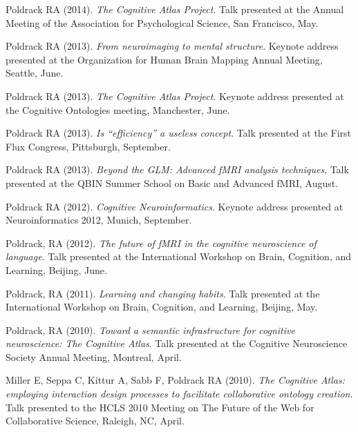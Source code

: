 \documentclass[10pt, letterpaper]{article}
\begin{document}
Poldrack RA (2014). \emph{The Cognitive Atlas Project}. Talk presented at the Annual Meeting of the Association for Psychological Science, San Francisco, May. \vspace{2mm}

Poldrack RA (2013). \emph{From neuroimaging to mental structure}. Keynote address presented at the Organization for Human Brain Mapping Annual Meeting, Seattle, June. \vspace{2mm}

Poldrack RA (2013). \emph{The Cognitive Atlas Project}. Keynote address presented at the Cognitive Ontologies meeting, Manchester, June. \vspace{2mm}

Poldrack RA (2013). \emph{Is ``efficiency'' a useless concept}. Talk presented at the First Flux Congress, Pittsburgh, September. \vspace{2mm}

Poldrack RA (2013). \emph{Beyond the GLM: Advanced fMRI analysis techniques}. Talk presented at the QBIN Summer School on Basic and Advanced fMRI, August. \vspace{2mm}

Poldrack RA (2012). \emph{Cognitive Neuroinformatics}. Keynote address presented at Neuroinformatics 2012, Munich, September. \vspace{2mm}

Poldrack, RA (2012). \emph{The future of fMRI in the cognitive neuroscience of language}. Talk presented at the International Workshop on Brain, Cognition, and Learning, Beijing, June. \vspace{2mm}

Poldrack, RA (2011). \emph{Learning and changing habits}. Talk presented at the International Workshop on Brain, Cognition, and Learning, Beijing, May. \vspace{2mm}

Poldrack, RA (2010). \emph{Toward a semantic infrastructure for cognitive neuroscience: The Cognitive Atlas}. Talk presented at the Cognitive Neuroscience Society Annual Meeting, Montreal, April. \vspace{2mm}

Miller E, Seppa C, Kittur A, Sabb F,  Poldrack RA (2010). \emph{The Cognitive Atlas: employing interaction design processes to facilitate collaborative ontology creation}. Talk presented to the HCLS 2010 Meeting on The Future of the Web for Collaborative Science, Raleigh, NC, April. \vspace{2mm}
\end{document}
